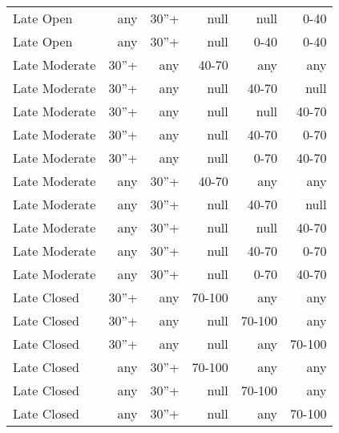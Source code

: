 \begin{table}[!htbp]
\begin{tabular}{@{}lrrrrr@{}}
Late Open        & any            & 30''+    & null   & null   & 0-40   \\
Late Open        & any            & 30''+    & null   & 0-40   & 0-40   \\
Late Moderate    & 30''+           & any     & 40-70  & any    & any    \\
Late Moderate    & 30''+           & any     & null   & 40-70  & null   \\
Late Moderate    & 30''+           & any     & null   & null   & 40-70  \\
Late Moderate    & 30''+           & any     & null   & 40-70  & 0-70   \\
Late Moderate    & 30''+           & any     & null   & 0-70   & 40-70  \\
Late Moderate    & any            & 30''+    & 40-70  & any    & any    \\
Late Moderate    & any            & 30''+    & null   & 40-70  & null   \\
Late Moderate    & any            & 30''+    & null   & null   & 40-70  \\
Late Moderate    & any            & 30''+    & null   & 40-70  & 0-70   \\
Late Moderate    & any            & 30''+    & null   & 0-70   & 40-70  \\
Late Closed      & 30''+           & any     & 70-100 & any    & any    \\
Late Closed      & 30''+           & any     & null   & 70-100 & any    \\
Late Closed      & 30''+           & any     & null   & any    & 70-100 \\
Late Closed      & any            & 30''+    & 70-100 & any    & any    \\
Late Closed      & any            & 30''+    & null   & 70-100 & any    \\
Late Closed      & any            & 30''+    & null   & any    & 70-100 \\ \bottomrule
\end{tabular}
\end{table}


\clearpage

